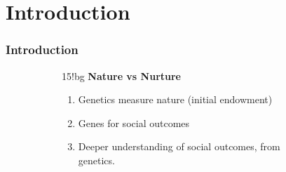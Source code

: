 \documentclass[dvipsnames,handout]{beamer} %
\begin{document}
\section{Introduction}
\begin{frame}
    \frametitle{Introduction}
    \vspace{-0.25cm}
    \begin{figure}[h!]
        \centering
        \singlespacing
        \begin{subfigure}[c]{0.5\textwidth}
            \centering
            \vspace{4.5cm}
        \end{subfigure}
        \hfill
        \begin{subfigure}[c]{0.45\textwidth}
            \vspace{0.25cm}

            \begin{colormixin}{15!bg}
            \textbf{Nature vs Nurture}
            \begin{enumerate}
                \item Genetics measure nature (initial endowment)
                \item Genes for social outcomes
                \item Deeper understanding of social outcomes, from genetics.
            \end{enumerate}
            \end{colormixin}
        \end{subfigure}
    \end{figure}
\end{frame}
\end{document}
